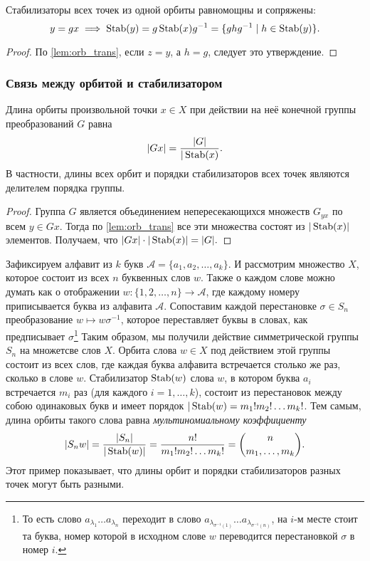 \begin{proposition}
    Стабилизаторы всех точек из одной орбиты равномощны и сопряжены: \[
    y = gx \implies \operatorname{Stab}(y) = g \operatorname{Stab}(x) g^{-1} = \{ ghg^{-1} \mid h \in \operatorname{Stab}(y) \}.\]
    \begin{proof}
        По \cref{lem:orb_trans}, если $z = y$, а $h=g$, следует это утверждение.
    \end{proof}
\end{proposition}
\subsubsection{Связь между орбитой и стабилизатором}

\begin{proposition}
Длина орбиты произвольной точки $x \in X$ при действии на неё конечной группы преобразований $G$ равна $$|Gx| = \frac{|G|}{|\operatorname{Stab}(x)}.$$ В частности, длины всех орбит и порядки стабилизаторов всех точек являются делителем порядка группы.
\end{proposition}
\begin{proof}
    Группа $G$ является объединением непересекающихся множеств $G_{yx}$ по всем $y \in Gx$. Тогда по \cref{lem:orb_trans} все эти множества состоят из $|\operatorname{Stab}(x)|$ элементов. Получаем, что $|Gx|\cdot|\operatorname{Stab}(x)|=|G|.$
\end{proof}

\begin{example}
    Зафиксируем алфавит из $k$ букв $\mathcal A = \{a_1, a_2, \ldots, a_k\}$. И рассмотрим множество $X$, которое состоит из всех $n$ буквенных слов $w$. Также о каждом слове можно думать как о отображении $w \colon \{1, 2, \ldots, n \} \to \mathcal A$, где каждому номеру приписывается буква из алфавита $\mathcal A$. Сопоставим каждой перестановке $\sigma \in S_n$ преобразование $w \mapsto w\sigma^{-1}$, которое переставляет буквы в словах, как предписывает $\sigma$\footnote{То есть слово $a_{\lambda_1}\ldots a_{\lambda_n}$ переходит в слово $a_{\lambda_{\sigma^{-1}(1)}}\ldots a_{\lambda_{\sigma^{-1}(n)}}$, на $i$-м месте стоит та буква, номер которой в исходном слове $w$ переводится перестановкой $\sigma$ в номер $i$.}
    Таким образом, мы получили действие симметрической группы $S_n$ на множетсве слов $X$. Орбита слова $w \in X$ под действием этой группы состоит из всех слов, где каждая буква алфавита встречается столько же раз, сколько в слове $w$. Стабилизатор $\operatorname{Stab}(w)$ слова $w$, в котором буква $a_i$ встречается $m_i$ раз (для каждого $i = 1, \ldots, k$), состоит из перестановок между собою одинаковых букв и имеет порядок $|\operatorname{Stab}(w) = m_1!m_2!\ldots m_k!$. Тем самым, длина орбиты такого слова равна \emph{мультиномиальному коэффициенту}
    \[ |S_nw| = \frac{|S_n|}{|\operatorname{Stab}(w)|} = \frac{n!}{m_1!m_2!\ldots m_k!} = \binom{n}{m_1, \ldots, m_k}.
    \]
Этот пример показывает, что длины орбит и порядки стабилизаторов разных точек могут быть разными.
\end{example}
